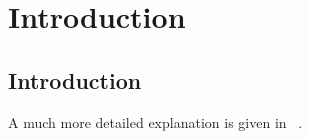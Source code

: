 \chapter{Introduction}\label{cha:introduction}

\section{Introduction}

A much more detailed explanation is given in ~\cite{Gotts2003}.



